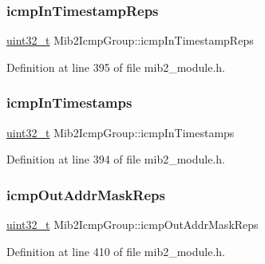 \mbox{\label{structMib2IcmpGroup_acfcbcab318f9a0757e5965aec26771a0}} 
\subsubsection{\texorpdfstring{icmp\+In\+Timestamp\+Reps}{icmpInTimestampReps}}
{\footnotesize\ttfamily \hyperlink{stdint_8h_a435d1572bf3f880d55459d9805097f62}{uint32\+\_\+t} Mib2\+Icmp\+Group\+::icmp\+In\+Timestamp\+Reps}



Definition at line 395 of file mib2\+\_\+module.\+h.

\mbox{\label{structMib2IcmpGroup_a70ded27582d286c47b377812534bcffe}} 
\subsubsection{\texorpdfstring{icmp\+In\+Timestamps}{icmpInTimestamps}}
{\footnotesize\ttfamily \hyperlink{stdint_8h_a435d1572bf3f880d55459d9805097f62}{uint32\+\_\+t} Mib2\+Icmp\+Group\+::icmp\+In\+Timestamps}



Definition at line 394 of file mib2\+\_\+module.\+h.

\mbox{\label{structMib2IcmpGroup_ae23bfb398db159b13bf9785901a7b0d1}} 
\subsubsection{\texorpdfstring{icmp\+Out\+Addr\+Mask\+Reps}{icmpOutAddrMaskReps}}
{\footnotesize\ttfamily \hyperlink{stdint_8h_a435d1572bf3f880d55459d9805097f62}{uint32\+\_\+t} Mib2\+Icmp\+Group\+::icmp\+Out\+Addr\+Mask\+Reps}



Definition at line 410 of file mib2\+\_\+module.\+h.

